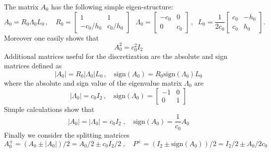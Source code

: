 \documentclass[10pt]{article}
\begin{document}
 The matrix $A_0$ has the following simple eigen-structure:
  \begin{equation}\label{eq:3}
 A_0= R_0\Lambda_0 L_0 \,,\quad
 R_0=\left[\begin{array}{cc}1 & 1\\
-c_0/h_0&c_0/h_0
\end{array}\right]\,\;\;
\Lambda_0=\left[\begin{array}{cc} -c_0 &  0\\
0&c_0
\end{array}\right]\,,\;\;
L_0=\dfrac{1}{2c_0}\left[\begin{array}{cc} c_0 &- h_0\\
c_0&h_0
\end{array}\right].
\end{equation}
Moreover one easily shows that
  \begin{equation}\label{eq:30}
  A_0^2 = c_0^2 I_2
\end{equation}  
 Additional matrices useful for the   discretization  are the absolute and sign matrices defined as 
   \begin{equation}\label{eq:3a}
   | A_0|= R_0|\Lambda_0| L_0 \,,\quad
      \text{sign}(A_0) = R_0       \text{sign}(\Lambda_0) L_0
\end{equation}
where the absolute and sign value of the eigenvalue matrix  $\Lambda_0$ are
   \begin{equation}\label{eq:3b}
|\Lambda_0|  = c_0  I_2 \,,\quad
      \text{sign}(\Lambda_0)  =
      \left[\begin{array}{cc} -1 &  0\\
 0&1
\end{array}\right]
\end{equation} 
Simple calculations show that
 \begin{equation}\label{eq:3c}
   |A_0|=|\Lambda_0| =  c_0  I_2\;,\quad
    \text{sign}(A_0)=\dfrac{1}{c_0}A_0
\end{equation}
Finally we consider the  splitting   matrices
    \begin{equation}\label{eq:3d}
        A^{\pm}_0 = (A_0  \pm |A_0| )/2 
    =   A_0/2   \pm c_0I_2/2\;,\quad
    P^{\pm} = (I_2 \pm \text{sign}(A_0))/2 
    = I_2/2  \pm A_0/2c_0
\end{equation}
 
\end{document}
